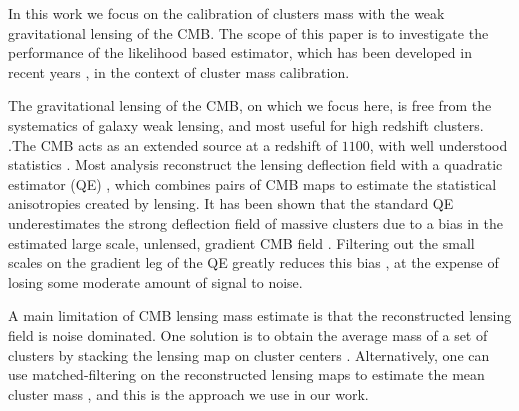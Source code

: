 \documentclass[prd, superscriptaddress, tightenlines, longbibliography, nofootinbib, eqsecnum, amsfonts, amsmath, floatfix, twocolumn, notitlepage]{revtex4-2}
\newcommand{\JC}[1]{\color{purple}{{JC:#1}}\color{black}\xspace}
\newcommand{\LL}[1]{{\color{orange}{LL: #1}}}
\begin{document}
In this work we focus on the calibration of clusters mass with the weak gravitational lensing of the CMB. 
The scope of this paper is to investigate the performance of the likelihood based estimator, which has been developed in recent years \cite{Carron:2017mqf}, in the context of cluster mass calibration. 


The gravitational lensing of the CMB, on which we focus here, is free from the systematics of galaxy weak lensing, and most useful for high redshift clusters. \JC{but CMB also has systematics}.The CMB acts as an extended source at a redshift of $1100$, with well understood statistics \cite{Lewis:2006fu}.
Most analysis reconstruct the lensing deflection field with a quadratic estimator (QE) \cite{Hu:2001tn, Hu:2001kj, Okamoto:2003zw, Planck:2018lbu}, which combines pairs of CMB maps to estimate the statistical anisotropies created by lensing. 
It has been shown that the standard QE underestimates the strong deflection field of massive clusters due to a bias in the estimated large scale, unlensed, gradient CMB field \cite{Maturi:2004zj}. Filtering out the small scales on the gradient leg of the QE greatly reduces this bias \cite{Hu:2007bt}, at the expense of losing some moderate amount of signal to noise.

A main limitation of CMB lensing mass estimate is that the reconstructed lensing field is noise dominated. One solution is to obtain the average mass of a set of clusters by stacking the lensing map on cluster centers \cite{DES:2017fyz, Geach:2017crt, DES:2018myw, ACT:2020izl}. Alternatively, one can use matched-filtering on the reconstructed lensing maps to estimate the mean cluster mass \cite{Melin:2014uaa, Louis:2016gvv, Zubeldia:2019brr}, and this is the approach we use in our work.
\end{document}
